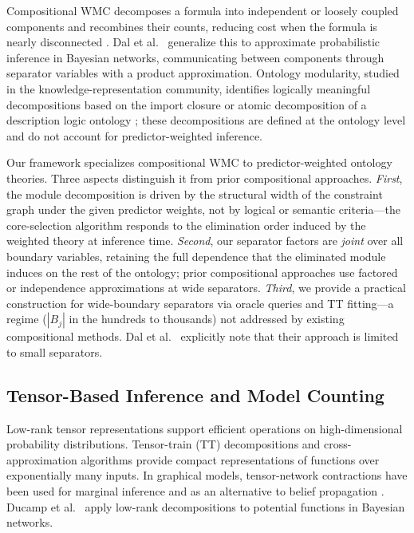 Compositional WMC decomposes a formula into independent or loosely
coupled components and recombines their counts, reducing cost when
the formula is nearly disconnected \citep{dal2017partitioned,
dal2021compositional}. Dal et al.\ \citeyearpar{dal2021compositional}
generalize this to approximate probabilistic inference in Bayesian
networks, communicating between components through separator variables
with a product approximation. Ontology modularity, studied in the
knowledge-representation community, identifies logically meaningful
decompositions based on the import closure or atomic decomposition of
a description logic ontology \citep{cuencagrau2008modular,
delvescovo2011atomic}; these decompositions are defined at the
ontology level and do not account for predictor-weighted inference.

Our framework specializes compositional WMC to predictor-weighted
ontology theories. Three aspects distinguish it from prior compositional
approaches. \emph{First}, the module decomposition is driven by the
structural width of the constraint graph under the given predictor
weights, not by logical or semantic criteria---the core-selection
algorithm responds to the elimination order induced by the weighted
theory at inference time. \emph{Second}, our separator factors are
\emph{joint} over all boundary variables, retaining the full dependence
that the eliminated module induces on the rest of the ontology; prior
compositional approaches use factored or independence approximations
at wide separators. \emph{Third}, we provide a practical construction
for wide-boundary separators via oracle queries and TT fitting---a regime
($|B_j|$ in the hundreds to thousands) not addressed by existing
compositional methods. Dal et al.\ \citeyearpar{dal2021compositional}
explicitly note that their approach is limited to small separators.


\subsection{Tensor-Based Inference and Model Counting}

Low-rank tensor representations support efficient operations on
high-dimensional probability distributions. Tensor-train (TT)
decompositions \citep{oseledets2011tt} and cross-approximation
algorithms \citep{oseledets2010ttcross} provide compact representations
of functions over exponentially many inputs. In graphical models,
tensor-network contractions have been used for marginal inference
\citep{novikov2014mrf} and as an alternative to belief propagation
\citep{wrigley2017tensorbp}. Ducamp et al.\ \citeyearpar{ducamp2020lowrank}
apply low-rank decompositions to potential functions in Bayesian networks.

